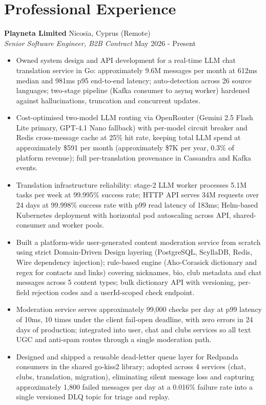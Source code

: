 \documentclass[11pt,a4paper]{article}
\newcommand{\jobentry}[4]{%
  \noindent\textbf{#1} \hfill #2\\
  \textit{#3} \hfill #4\par\vspace{2pt}
}
\begin{document}
\section{Professional Experience}

\jobentry{Playneta Limited}{Nicosia, Cyprus (Remote)}{Senior Software Engineer, B2B Contract}{May 2026 - Present}
\begin{itemize}
\item Owned system design and API development for a real-time LLM chat translation service in Go: approximately 9.6M messages per month at 612ms median and 981ms p95 end-to-end latency; auto-detection across 26 source languages; two-stage pipeline (Kafka consumer to asynq worker) hardened against hallucinations, truncation and concurrent updates.
\item Cost-optimised two-model LLM routing via OpenRouter (Gemini 2.5 Flash Lite primary, GPT-4.1 Nano fallback) with per-model circuit breaker and Redis cross-message cache at 25\% hit rate, keeping total LLM spend at approximately \$591 per month (approximately \$7K per year, 0.3\% of platform revenue); full per-translation provenance in Cassandra and Kafka events.
\item Translation infrastructure reliability: stage-2 LLM worker processes 5.1M tasks per week at 99.995\% success rate; HTTP API serves 34M requests over 24 days at 99.998\% success rate with p99 read latency of 183ms; Helm-based Kubernetes deployment with horizontal pod autoscaling across API, shared-consumer and worker pools.
\item Built a platform-wide user-generated content moderation service from scratch using strict Domain-Driven Design layering (PostgreSQL, ScyllaDB, Redis, Wire dependency injection); rule-based engine (Aho-Corasick dictionary and regex for contacts and links) covering nicknames, bio, club metadata and chat messages across 5 content types; bulk dictionary API with versioning, per-field rejection codes and a userId-scoped check endpoint.
\item Moderation service serves approximately 99,000 checks per day at p99 latency of 10ms, 10 times under the client fail-open deadline, with zero errors in 24 days of production; integrated into user, chat and clubs services so all text UGC and anti-spam routes through a single moderation path.
\item Designed and shipped a reusable dead-letter queue layer for Redpanda consumers in the shared go-kiss2 library; adopted across 4 services (chat, clubs, translation, migration), eliminating silent message loss and capturing approximately 1,800 failed messages per day at a 0.016\% failure rate into a single versioned DLQ topic for triage and replay.

\end{itemize}
\end{document}
